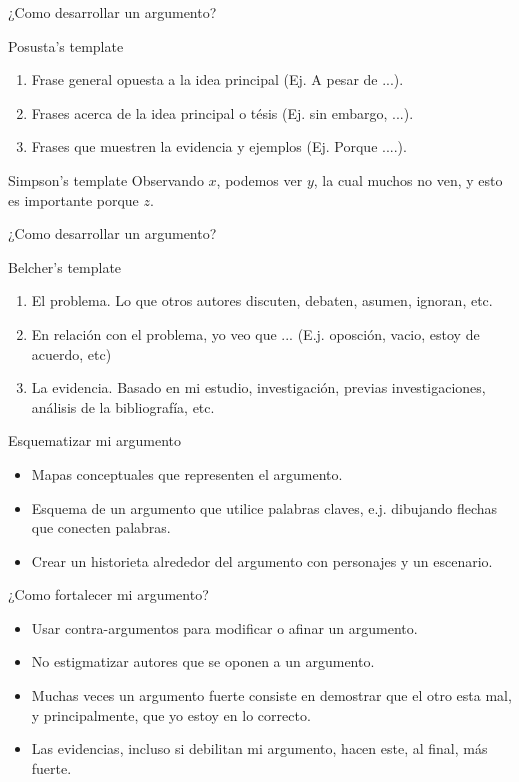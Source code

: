 \documentclass [xcolor=svgnames, t] {beamer}
\begin{document}
\begin{frame}{¿Como desarrollar un argumento?}
\begin{exampleblock}{Posusta's template}
\begin{enumerate}
\item Frase general opuesta a la idea principal (Ej. A pesar de ...).
\item Frases acerca de la idea principal o t\'esis (Ej. sin embargo, ...).
\item Frases que muestren la evidencia y ejemplos (Ej. Porque ....).
\end{enumerate}
\end{exampleblock}
\begin{exampleblock}{Simpson's template}
Observando $x$, podemos ver $y$, la cual muchos no ven, y esto es importante porque $z$.
\end{exampleblock}
\end{frame}

\begin{frame}{¿Como desarrollar un argumento?}
\begin{exampleblock}{Belcher's template}
\begin{enumerate}
\item El problema. Lo que otros autores discuten, debaten, asumen, ignoran, etc.
\item En relaci\'on con el problema, yo veo que ... (E.j. oposci\'on, vacio, estoy de acuerdo, etc)
\item La evidencia. Basado en mi estudio, investigaci\'on, previas investigaciones, an\'alisis de la bibliograf\'ia, etc.
\end{enumerate}
\end{exampleblock}
\end{frame}

\begin{frame}{Esquematizar mi argumento}
\begin{itemize}
\item Mapas conceptuales que representen el argumento.
\item Esquema de un argumento que utilice palabras claves, e.j. dibujando flechas que conecten palabras.
\item Crear un historieta alrededor del argumento con personajes y un escenario.
\end{itemize}
\end{frame}

\begin{frame}{¿Como fortalecer mi argumento?}
\begin{itemize}
\item Usar contra-argumentos para modificar o afinar un argumento.
\item No estigmatizar autores que se oponen a un argumento.
\item Muchas veces un argumento fuerte consiste en demostrar que el otro esta mal, y principalmente, que yo estoy en lo correcto. 
\item Las evidencias, incluso si debilitan mi argumento, hacen este, al final, m\'as fuerte.
\end{itemize}
\end{frame}
\end{document}
